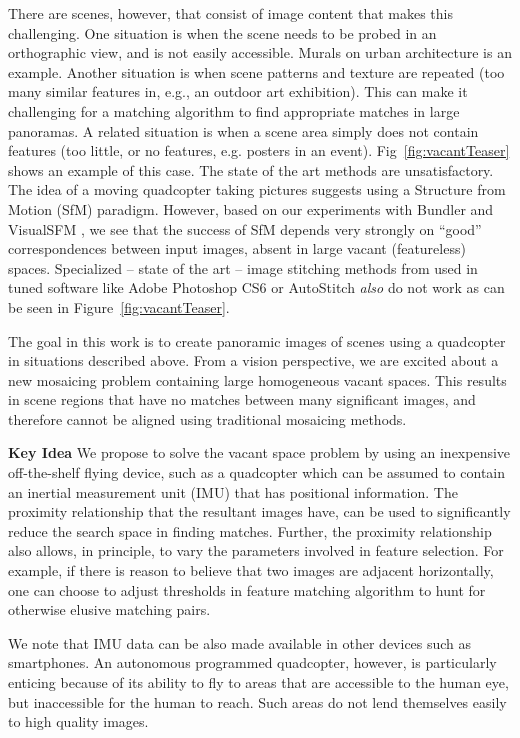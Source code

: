 There are scenes, however, that consist of image content that makes
this challenging.  One situation is when the scene needs to be probed
in an orthographic view, and is not easily accessible.  Murals on
urban architecture is an example. Another situation is when scene
patterns and texture are repeated (too many similar features in, e.g.,
an outdoor art exhibition).  This can make it challenging for a
matching algorithm to find appropriate matches in large panoramas.  A
related situation is when a scene area simply does not contain
features (too little, or no features, e.g. posters in an event).
Fig~\ref{fig:vacantTeaser} shows an example of this case.  The state of the
art methods are unsatisfactory.  The idea of a moving quadcopter
taking pictures suggests using a Structure from Motion (SfM) paradigm.
However, based on our experiments with Bundler\cite{Snavely06,
  Snavely07} and VisualSFM \cite{Wu13}, we see that the success of SfM
depends very strongly on ``good'' correspondences between input
images, absent in large vacant (featureless) spaces. Specialized -- state of the art -- image stitching 
methods from \cite{Brown03, Brown05} used in tuned software like Adobe 
Photoshop CS6 or AutoStitch \emph{also} do not work as can be seen 
in Figure~\ref{fig:vacantTeaser}.


The goal in this work is to create panoramic images of scenes using a
quadcopter in situations described above. From a vision perspective,
we are excited about a new mosaicing problem containing large
homogeneous vacant spaces.  This results in scene regions that have no
matches between many significant images, and therefore cannot be
aligned using traditional mosaicing methods.


{\bf Key Idea} We propose to solve the vacant space problem by using
an inexpensive off-the-shelf flying device, such as a quadcopter which
can be assumed to contain an inertial measurement unit (IMU) that has
positional information.  The proximity relationship that the resultant
images have, can be used to significantly reduce the search space in
finding matches.  Further, the proximity relationship also allows, in
principle, to vary the parameters involved in feature selection. For
example, if there is reason to believe that two images are adjacent
horizontally, one can choose to adjust thresholds in feature matching
algorithm to hunt for otherwise elusive matching pairs.

We note that IMU data can be also made available in other devices such
as smartphones.  An autonomous programmed quadcopter, however, is
particularly enticing because of its ability to fly to areas that are
accessible to the human eye, but inaccessible for the human to
reach. Such areas do not lend themselves easily to high quality
images. 


